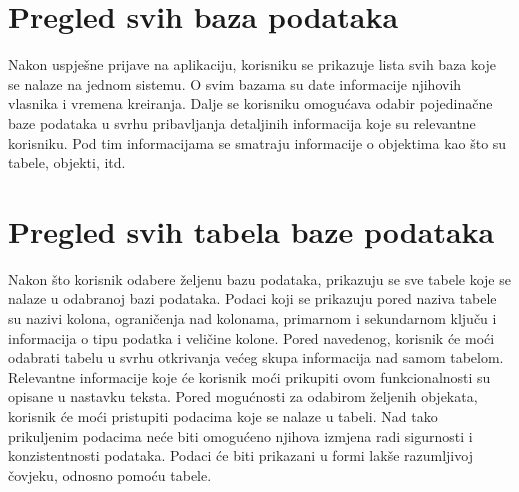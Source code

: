 \documentclass[12pt, a4paper]{report}
\theoremstyle{definition}
\begin{document}
\section{Pregled svih baza podataka}
Nakon uspješne prijave na aplikaciju, korisniku se prikazuje lista svih baza koje se nalaze na jednom sistemu. O svim bazama su date informacije njihovih vlasnika i vremena kreiranja. Dalje se korisniku omogućava odabir pojedinačne baze podataka u svrhu pribavljanja detaljinih informacija koje su relevantne korisniku. Pod tim informacijama se smatraju informacije o objektima kao što su tabele, objekti, itd. 

\section{Pregled svih tabela baze podataka}
Nakon što korisnik odabere željenu bazu podataka, prikazuju se sve tabele koje se nalaze u odabranoj bazi podataka. Podaci koji se prikazuju pored naziva tabele su nazivi kolona, ograničenja nad kolonama, primarnom i sekundarnom ključu i informacija o tipu podatka i veličine kolone. Pored navedenog, korisnik će moći odabrati tabelu u svrhu otkrivanja većeg skupa informacija nad samom tabelom. Relevantne informacije koje će korisnik moći prikupiti ovom funkcionalnosti su opisane u nastavku teksta. 
Pored mogućnosti za odabirom željenih objekata, korisnik će moći pristupiti podacima koje se nalaze u tabeli. Nad tako prikuljenim podacima neće biti omogućeno njihova izmjena radi sigurnosti i konzistentnosti podataka. Podaci će biti prikazani u formi lakše razumljivoj čovjeku, odnosno pomoću tabele.
\end{document}
